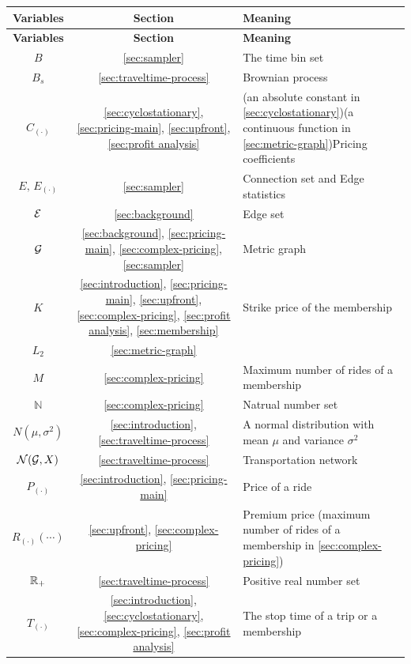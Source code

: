\documentclass[12pt]{article}
\begin{document}
{{{{{{\begin{appendices}
\begin{longtable}{|c|c|l|}
\hline
\textbf{Variables} & \textbf{Section}  & \textbf{Meaning}\\
\hline
\endfirsthead
\hline
\textbf{Variables} & \textbf{Section}  & \textbf{Meaning}\\
\hline
\endhead
\hline
\endfoot
\hline
\endlastfoot
\(B\) & \ref{sec:sampler} & The time bin set\\
\(B_{s}\) & \ref{sec:traveltime-process} & Brownian process\\
\(C_{(\cdot)}\) & \ref{sec:cyclostationary}, \ref{sec:pricing-main}, \ref{sec:upfront}, \ref{sec:profit analysis} & (an absolute constant in \ref{sec:cyclostationary})(a continuous function in \ref{sec:metric-graph})Pricing coefficients\\
\(E,\,E_{(\cdot)}\) & \ref{sec:sampler} & Connection set and Edge statistics \\
\(\mathcal{E}\) & \ref{sec:background} & Edge set \\
\(\mathcal{G}\) & \ref{sec:background}, \ref{sec:pricing-main}, \ref{sec:complex-pricing}, \ref{sec:sampler} & Metric graph \\
\(K\) & \ref{sec:introduction}, \ref{sec:pricing-main},  \ref{sec:upfront}, \ref{sec:complex-pricing}, \ref{sec:profit analysis}, \ref{sec:membership} & Strike price of the membership\\
\(L_2\)&\ref{sec:metric-graph} & \\
\(M\) & \ref{sec:complex-pricing} & Maximum number of rides of a membership \\
\(\mathbb{N}\)& \ref{sec:complex-pricing} & Natrual number set\\
\(N(\mu,\sigma^2)\) & \ref{sec:introduction},\ref{sec:traveltime-process} & A normal distribution with mean $\mu$ and variance $\sigma^2$\\
\(\mathcal{N}(\mathcal{G},X)\) & \ref{sec:traveltime-process} & Transportation network\\
\(P_{(\cdot)}\) & \ref{sec:introduction}, \ref{sec:pricing-main}& Price of a ride \\
\(R_{(\cdot)}(\cdots)\) & \ref{sec:upfront}, \ref{sec:complex-pricing} & Premium price (maximum number of rides of a membership in \ref{sec:complex-pricing})\\
\(\mathbb{R}_+\) & \ref{sec:traveltime-process} & Positive real number set \\
\(T_{(\cdot)}\) & \ref{sec:introduction}, \ref{sec:cyclostationary}, \ref{sec:complex-pricing}, \ref{sec:profit analysis} & The stop time of a trip or a membership \\

\end{longtable}
\end{appendices}}}}}}}
\end{document}
